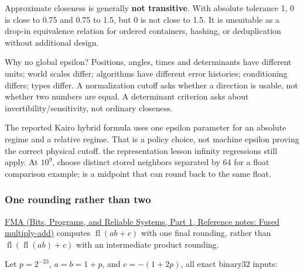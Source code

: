 Approximate closeness is generally \textbf{not transitive}. With absolute tolerance 1, 0 is close to 0.75 and 0.75 to 1.5, but 0 is not close to 1.5. It is unsuitable as a drop-in equivalence relation for ordered containers, hashing, or deduplication without additional design.

Why no global epsilon? Positions, angles, times and determinants have different units; world scales differ; algorithms have different error histories; conditioning differs; types differ. A normalization cutoff asks whether a direction is usable, not whether two numbers are equal. A determinant criterion asks about invertibility/sensitivity, not ordinary closeness.

The reported Kairo hybrid formula uses one epsilon parameter for an absolute regime and a relative regime. That is a policy choice, not machine epsilon proving the correct physical cutoff. the representation lesson infinity regressions still apply. At \(10^9\), choose distinct stored neighbors separated by 64 for a float comparison example;  is a midpoint that can round back to the same float.

\subsubsection{One rounding rather than two}\label{05-engine-i-ch001-one-rounding-rather-than-two}

\hypertarget{05-engine-i-ch001-one-rounding-rather-than-two}{}

\href{../01-Bits-Programs-and-Reliable-Systems-P01/main.pdf\#appendix-41e8ef22a21e}{FMA (Bits, Programs, and Reliable Systems, Part 1, Reference notes: Fused multiply-add)} computes \(\operatorname{fl}(ab+c)\) with one final rounding, rather than \(\operatorname{fl}(\operatorname{fl}(ab)+c)\) with an intermediate product rounding.

Let \(p=2^{-23}\), \(a=b=1+p\), and \(c=-(1+2p)\), all exact binary32 inputs:


